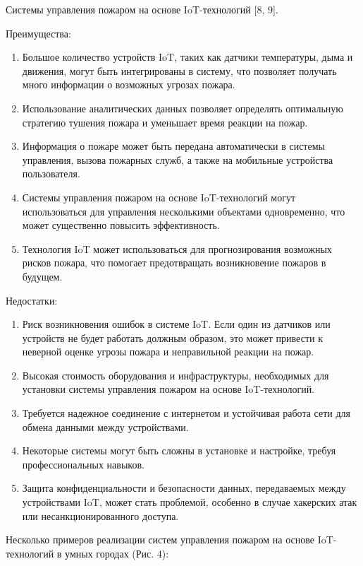 \begin{multicols}{2}
Системы управления пожаром на основе IoT-технологий {[}8, 9{]}.

Преимущества:

\begin{enumerate}
\def\labelenumi{\arabic{enumi}.}
\item
  Большое количество устройств IoT, таких как датчики температуры, дыма
  и движения, могут быть интегрированы в систему, что позволяет получать
  много информации о возможных угрозах пожара.
\item
  Использование аналитических данных позволяет определять оптимальную
  стратегию тушения пожара и уменьшает время реакции на пожар.
\item
  Информация о пожаре может быть передана автоматически в системы
  управления, вызова пожарных служб, а также на мобильные устройства
  пользователя.
\item
  Системы управления пожаром на основе IoT-технологий могут
  использоваться для управления несколькими объектами одновременно, что
  может существенно повысить эффективность.
\item
  Технология IoT может использоваться для прогнозирования возможных
  рисков пожара, что помогает предотвращать возникновение пожаров в
  будущем.
\end{enumerate}

Недостатки:

\begin{enumerate}
\def\labelenumi{\arabic{enumi}.}
\item
  Риск возникновения ошибок в системе IoT. Если один из датчиков или
  устройств не будет работать должным образом, это может привести к
  неверной оценке угрозы пожара и неправильной реакции на пожар.
\item
  Высокая стоимость оборудования и инфраструктуры, необходимых для
  установки системы управления пожаром на основе IoT-технологий.
\item
  Требуется надежное соединение с интернетом и устойчивая работа сети
  для обмена данными между устройствами.
\item
  Некоторые системы могут быть сложны в установке и настройке, требуя
  профессиональных навыков.
\item
  Защита конфиденциальности и безопасности данных, передаваемых между
  устройствами IoT, может стать проблемой, особенно в случае хакерских
  атак или несанкционированного доступа.
\end{enumerate}

Несколько примеров реализации систем управления пожаром на основе
IoT-технологий в умных городах (Рис. 4):


\end{multicols}

